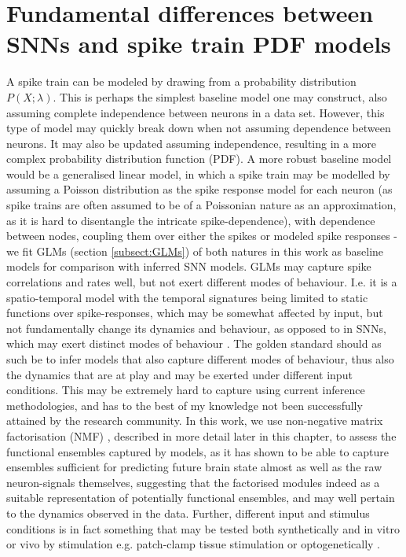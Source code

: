 \documentclass[mphil,deptreport,ianc]{infthesis} %
\begin{document}
\section{Fundamental differences between SNNs and spike train PDF models}

A spike train can be modeled by drawing from a probability distribution $P(X; \lambda)$.
This is perhaps the simplest baseline model one may construct, also assuming complete independence between neurons in a data set.
However, this type of model may quickly break down when not assuming dependence between neurons.
It may also be updated assuming independence, resulting in a more complex probability distribution function (PDF).
A more robust baseline model would be a generalised linear model, in which a spike train may be modelled by assuming a Poisson distribution as the spike response model for each neuron (as spike trains are often assumed to be of a Poissonian nature as an approximation, as it is hard to disentangle the intricate spike-dependence), with dependence between nodes, coupling them over either the spikes or modeled spike responses - we fit GLMs (section \ref{subsect:GLMs}) of both natures in this work as baseline models for comparison with inferred SNN models.
GLMs may capture spike correlations and rates well, but not exert different modes of behaviour.
I.e. it is a spatio-temporal model with the temporal signatures being limited to static functions over spike-responses, which may be somewhat affected by input, but not fundamentally change its dynamics and behaviour, as opposed to in SNNs, which may exert distinct modes of behaviour \cite{Izhikevich2004}.
The golden standard should as such be to infer models that also capture different modes of behaviour, thus also the dynamics that are at play and may be exerted under different input conditions.
This may be extremely hard to capture using current inference methodologies, and has to the best of my knowledge not been successfully attained by the research community.
In this work, we use non-negative matrix factorisation (NMF) \cite{Seung1999, Seung2001}, described in more detail later in this chapter, to assess the functional ensembles captured by models, as it has shown to be able to capture ensembles sufficient for predicting future brain state almost as well as the raw neuron-signals themselves, suggesting that the factorised modules indeed as a suitable representation of potentially functional ensembles, and may well pertain to the dynamics observed in the data.
Further, different input and stimulus conditions is in fact something that may be tested both synthetically and in vitro or vivo by stimulation e.g. patch-clamp tissue stimulation or optogenetically \cite{VanDort2015}.
\end{document}
